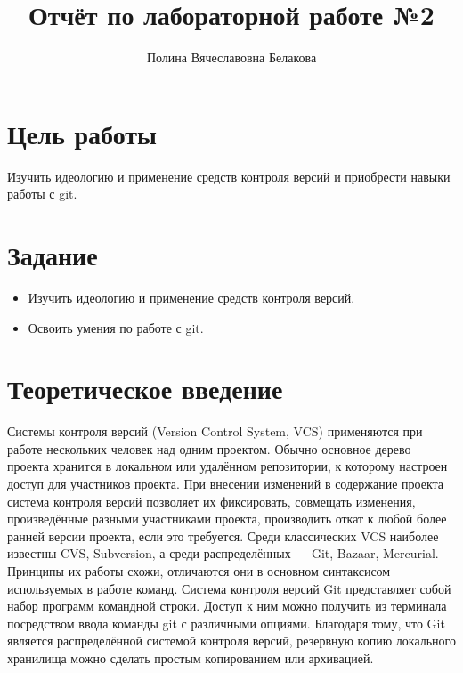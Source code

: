 \documentclass[
  english,
  russian,
  12pt,
  a4paper,
  DIV=11,
  numbers=noendperiod]{scrreprt}
\title{Отчёт по лабораторной работе №2}
\author{Полина Вячеславовна Белакова}
\date{}
\providecommand{\tightlist}{%
  \setlength{\itemsep}{0pt}\setlength{\parskip}{0pt}}
\renewcommand*\contentsname{Содержание}
\newcommand\contentsname{Содержание}
\begin{document}
\maketitle

\renewcommand*\contentsname{Содержание}
{
\setcounter{tocdepth}{1}
\tableofcontents
}
\listoffigures
\listoftables

\chapter{Цель
работы}\label{ux446ux435ux43bux44c-ux440ux430ux431ux43eux442ux44b}

Изучить идеологию и применение средств контроля версий и приобрести
навыки работы с git.

\chapter{Задание}\label{ux437ux430ux434ux430ux43dux438ux435}

\begin{itemize}
\tightlist
\item
  Изучить идеологию и применение средств контроля версий.
\item
  Освоить умения по работе с git.
\end{itemize}

\chapter{Теоретическое
введение}\label{ux442ux435ux43eux440ux435ux442ux438ux447ux435ux441ux43aux43eux435-ux432ux432ux435ux434ux435ux43dux438ux435}

Системы контроля версий (Version Control System, VCS) применяются при
работе нескольких человек над одним проектом. Обычно основное дерево
проекта хранится в локальном или удалённом репозитории, к которому
настроен доступ для участников проекта. При внесении изменений в
содержание проекта система контроля версий позволяет их фиксировать,
совмещать изменения, произведённые разными участниками проекта,
производить откат к любой более ранней версии проекта, если это
требуется. Среди классических VCS наиболее известны CVS, Subversion, а
среди распределённых --- Git, Bazaar, Mercurial. Принципы их работы
схожи, отличаются они в основном синтаксисом используемых в работе
команд. Система контроля версий Git представляет собой набор программ
командной строки. Доступ к ним можно получить из терминала посредством
ввода команды git с различными опциями. Благодаря тому, что Git является
распределённой системой контроля версий, резервную копию локального
хранилища можно сделать простым копированием или архивацией.
\end{document}
